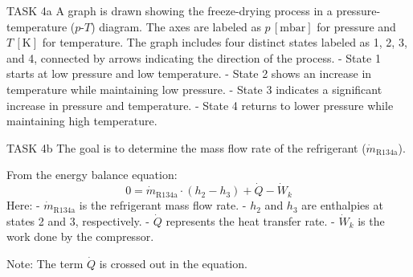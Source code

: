 TASK 4a  
A graph is drawn showing the freeze-drying process in a pressure-temperature (\( p \)-\( T \)) diagram. The axes are labeled as \( p \, [\text{mbar}] \) for pressure and \( T \, [\text{K}] \) for temperature. The graph includes four distinct states labeled as 1, 2, 3, and 4, connected by arrows indicating the direction of the process.  
- State 1 starts at low pressure and low temperature.  
- State 2 shows an increase in temperature while maintaining low pressure.  
- State 3 indicates a significant increase in pressure and temperature.  
- State 4 returns to lower pressure while maintaining high temperature.  

TASK 4b  
The goal is to determine the mass flow rate of the refrigerant (\( \dot{m}_{\text{R134a}} \)).  

From the energy balance equation:  
\[
0 = \dot{m}_{\text{R134a}} \cdot (h_2 - h_3) + \dot{Q} - \dot{W}_k
\]  
Here:  
- \( \dot{m}_{\text{R134a}} \) is the refrigerant mass flow rate.  
- \( h_2 \) and \( h_3 \) are enthalpies at states 2 and 3, respectively.  
- \( \dot{Q} \) represents the heat transfer rate.  
- \( \dot{W}_k \) is the work done by the compressor.  

Note: The term \( \dot{Q} \) is crossed out in the equation.